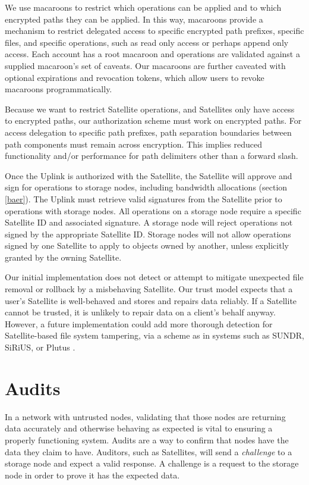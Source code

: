 \documentclass[8pt,fleqn,openany]{book}
\begin{document}
We use macaroons to restrict which operations can be applied and to which
encrypted paths they can be applied. In this way, macaroons provide a
mechanism to restrict delegated access to specific encrypted path prefixes,
specific files, and specific operations, such as read only access or perhaps
append only access.
Each account has a root macaroon and operations are validated against a supplied
macaroon's set of caveats.
Our macaroons are further caveated with optional expirations and revocation
tokens, which allow users to revoke macaroons programmatically.

Because we want to restrict Satellite operations, and Satellites only have access
to encrypted paths, our authorization scheme must work on encrypted paths. For
access delegation to specific path prefixes, path separation boundaries between
path components must remain across encryption. This implies reduced functionality
and/or performance for path delimiters other than a forward slash.

Once the Uplink is authorized with the Satellite, the Satellite will approve
and sign for operations to storage nodes, including bandwidth allocations
(section \ref{baer}).
The Uplink must retrieve valid signatures from the Satellite
prior to operations with storage nodes.
All operations on a storage node require a specific Satellite ID and associated
signature.
A storage node will reject operations not signed by the appropriate
Satellite ID. Storage nodes will not allow
operations signed by one Satellite to apply to objects owned by another, unless
explicitly granted by the owning Satellite.

Our initial implementation does not detect or attempt to mitigate unexpected
file removal or rollback by a misbehaving Satellite.
Our trust model expects that a user's Satellite is well-behaved and stores and
repairs data reliably.
If a Satellite cannot be trusted, it is unlikely to repair data on a client's
behalf anyway.
However, a future implementation could add more thorough detection for
Satellite-based file system tampering, via a scheme as in systems such as
SUNDR, SiRiUS, or Plutus \cite{sundr, sirius, plutus}.

\section{Audits}\label{sec:concrete-audits}

In a network with untrusted nodes, validating that those nodes are returning data
accurately and otherwise behaving as expected is vital to ensuring a properly
functioning system. Audits are a way to confirm that nodes have the data they
claim to have. Auditors, such as Satellites, will send a {\em challenge} to a
storage node and expect a valid response. A challenge is a request to the
storage node in order to prove it has the expected data.
\end{document}
